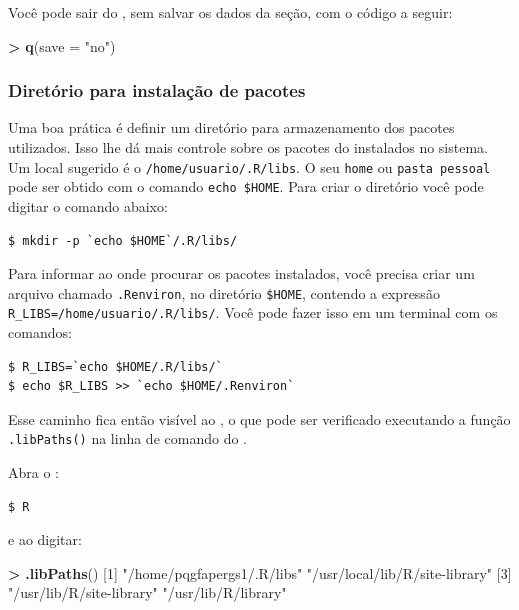 \documentclass[]{book}
\newenvironment{Shaded}{\begin{snugshade}}{\end{snugshade}}
\newcommand{\KeywordTok}[1]{\textcolor[rgb]{0.13,0.29,0.53}{\textbf{#1}}}
\newcommand{\DataTypeTok}[1]{\textcolor[rgb]{0.13,0.29,0.53}{#1}}
\newcommand{\DecValTok}[1]{\textcolor[rgb]{0.00,0.00,0.81}{#1}}
\newcommand{\StringTok}[1]{\textcolor[rgb]{0.31,0.60,0.02}{#1}}
\newcommand{\OperatorTok}[1]{\textcolor[rgb]{0.81,0.36,0.00}{\textbf{#1}}}
\newcommand{\NormalTok}[1]{#1}
\begin{document}
Você pode sair do , sem salvar os dados da seção, com o código a seguir:

\begin{Shaded}
\begin{Highlighting}[]
\OperatorTok{>}\StringTok{ }\KeywordTok{q}\NormalTok{(}\DataTypeTok{save =} \StringTok{"no"}\NormalTok{)}
\end{Highlighting}
\end{Shaded}

\subsubsection{Diretório para instalação de
pacotes}\label{diretorio-para-instalacao-de-pacotes}

Uma boa prática é definir um diretório para armazenamento dos pacotes
utilizados. Isso lhe dá mais controle sobre os pacotes do instalados no
sistema. Um local sugerido é o \texttt{/home/usuario/.R/libs}. O seu
\texttt{home} ou \texttt{pasta\ pessoal} pode ser obtido com o comando
\texttt{echo\ \$HOME}. Para criar o diretório você pode digitar o
comando abaixo:

\begin{verbatim}
$ mkdir -p `echo $HOME`/.R/libs/
\end{verbatim}

Para informar ao onde procurar os pacotes instalados, você precisa criar
um arquivo chamado \texttt{.Renviron}, no diretório \texttt{\$HOME},
contendo a expressão \texttt{R\_LIBS=/home/usuario/.R/libs/}. Você pode
fazer isso em um terminal com os comandos:

\begin{verbatim}
$ R_LIBS=`echo $HOME/.R/libs/`
$ echo $R_LIBS >> `echo $HOME/.Renviron`
\end{verbatim}

Esse caminho fica então visível ao , o que pode ser verificado
executando a função \texttt{.libPaths()} na linha de comando do .

Abra o :

\begin{verbatim}
$ R
\end{verbatim}

e ao digitar:

\begin{Shaded}
\begin{Highlighting}[]
\OperatorTok{>}\StringTok{ }\KeywordTok{.libPaths}\NormalTok{()}
\NormalTok{[}\DecValTok{1}\NormalTok{] }\StringTok{"/home/pqgfapergs1/.R/libs"}     \StringTok{"/usr/local/lib/R/site-library"}
\NormalTok{[}\DecValTok{3}\NormalTok{] }\StringTok{"/usr/lib/R/site-library"}       \StringTok{"/usr/lib/R/library"}           
\end{Highlighting}
\end{Shaded}
\end{document}
